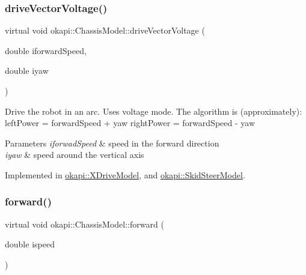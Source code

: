 \mbox{\label{classokapi_1_1ChassisModel_a69115758be9e29888dce34f317d57150}} 
\subsubsection{\texorpdfstring{driveVectorVoltage()}{driveVectorVoltage()}}
{\footnotesize\ttfamily virtual void okapi\+::\+Chassis\+Model\+::drive\+Vector\+Voltage (\begin{DoxyParamCaption}\item[{double}]{iforward\+Speed,  }\item[{double}]{iyaw }\end{DoxyParamCaption})\hspace{0.3cm}{\ttfamily [pure virtual]}}

Drive the robot in an arc. Uses voltage mode. The algorithm is (approximately)\+: left\+Power = forward\+Speed + yaw right\+Power = forward\+Speed -\/ yaw


\begin{DoxyParams}{Parameters}
{\em iforwad\+Speed} & speed in the forward direction \\
\hline
{\em iyaw} & speed around the vertical axis \\
\hline
\end{DoxyParams}


Implemented in \mbox{\hyperlink{classokapi_1_1XDriveModel_a2a066629991985282b8205af6b03d9f6}{okapi\+::\+X\+Drive\+Model}}, and \mbox{\hyperlink{classokapi_1_1SkidSteerModel_aa9b68af25f8f924117b07a5c8e9f6c93}{okapi\+::\+Skid\+Steer\+Model}}.

\mbox{\label{classokapi_1_1ChassisModel_ae39e8ccd15b6f84e32cd21fe99bdd6c9}} 
\subsubsection{\texorpdfstring{forward()}{forward()}}
{\footnotesize\ttfamily virtual void okapi\+::\+Chassis\+Model\+::forward (\begin{DoxyParamCaption}\item[{double}]{ispeed }\end{DoxyParamCaption})\hspace{0.3cm}{\ttfamily [pure virtual]}}

